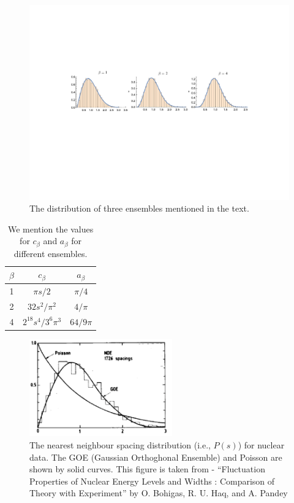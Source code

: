 \documentclass[11pt]{article}
\begin{document}
\begin{figure}[htbp] 
	\centering 
	\includegraphics[width=1.05\textwidth]{figs/ensem.pdf}
	\caption{\label{fig:ensem1}The distribution of three ensembles mentioned in the text.}
\end{figure}



\begin{table}[h!]
	\centering
	\begin{tabular}{||c c c||} 
		\hline
		$\beta$ & $c_{\beta}$ & $a_{\beta}$ \\ [0.5ex] 
		\hline\hline
		1 & $\pi s/2$ & $\pi/4$  \\ 
		2 & $32 s^2/\pi^2$ & $4/\pi$  \\
		4 & $2^{18} s^4/3^6 \pi^3$ & $64/9\pi$
		 \\ [1ex] 
		\hline 
	\end{tabular}
\caption{We mention the values for $c_{\beta}$ and $a_{\beta}$ for different ensembles.}
\label{table:c_and_a}
\end{table}


\begin{figure}[htbp] 
	\centering 
	\includegraphics[width=0.55\textwidth]{figs/data_exp.png}
	\caption{\label{fig:data_exp1}The nearest neighbour spacing distribution (i.e., $P(s)$) 
	for nuclear data. The GOE (Gaussian Orthoghonal Ensemble) and Poisson are shown 
	by solid curves. This figure is taken from - ``Fluctuation Properties of Nuclear Energy 
	Levels and Widths : Comparison of Theory with Experiment'' by O. Bohigas, R. U. 
	Haq, and A. Pandey}
\end{figure}
\end{document}
